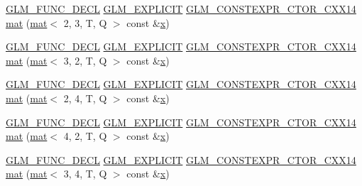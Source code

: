 \begin{DoxyCompactItemize}
\item 
\hyperlink{setup_8hpp_ab2d052de21a70539923e9bcbf6e83a51}{G\+L\+M\+\_\+\+F\+U\+N\+C\+\_\+\+D\+E\+CL} \hyperlink{setup_8hpp_a6c74f5a5e7b134ab69023ff9a30d4d5d}{G\+L\+M\+\_\+\+E\+X\+P\+L\+I\+C\+IT} \hyperlink{setup_8hpp_a0900f9145e68bf6061b6f5e7be3fa751}{G\+L\+M\+\_\+\+C\+O\+N\+S\+T\+E\+X\+P\+R\+\_\+\+C\+T\+O\+R\+\_\+\+C\+X\+X14} \hyperlink{structglm_1_1mat_3_012_00_012_00_01_t_00_01_q_01_4_a51e6cec9e2de56805620067b1a0bf615}{mat} (\hyperlink{structglm_1_1mat}{mat}$<$ 2, 3, T, Q $>$ const \&\hyperlink{_s_d_l__opengl_8h_ad0e63d0edcdbd3d79554076bf309fd47}{x})
\item 
\hyperlink{setup_8hpp_ab2d052de21a70539923e9bcbf6e83a51}{G\+L\+M\+\_\+\+F\+U\+N\+C\+\_\+\+D\+E\+CL} \hyperlink{setup_8hpp_a6c74f5a5e7b134ab69023ff9a30d4d5d}{G\+L\+M\+\_\+\+E\+X\+P\+L\+I\+C\+IT} \hyperlink{setup_8hpp_a0900f9145e68bf6061b6f5e7be3fa751}{G\+L\+M\+\_\+\+C\+O\+N\+S\+T\+E\+X\+P\+R\+\_\+\+C\+T\+O\+R\+\_\+\+C\+X\+X14} \hyperlink{structglm_1_1mat_3_012_00_012_00_01_t_00_01_q_01_4_ad9bacde1c317144090d0254c04e43fd3}{mat} (\hyperlink{structglm_1_1mat}{mat}$<$ 3, 2, T, Q $>$ const \&\hyperlink{_s_d_l__opengl_8h_ad0e63d0edcdbd3d79554076bf309fd47}{x})
\item 
\hyperlink{setup_8hpp_ab2d052de21a70539923e9bcbf6e83a51}{G\+L\+M\+\_\+\+F\+U\+N\+C\+\_\+\+D\+E\+CL} \hyperlink{setup_8hpp_a6c74f5a5e7b134ab69023ff9a30d4d5d}{G\+L\+M\+\_\+\+E\+X\+P\+L\+I\+C\+IT} \hyperlink{setup_8hpp_a0900f9145e68bf6061b6f5e7be3fa751}{G\+L\+M\+\_\+\+C\+O\+N\+S\+T\+E\+X\+P\+R\+\_\+\+C\+T\+O\+R\+\_\+\+C\+X\+X14} \hyperlink{structglm_1_1mat_3_012_00_012_00_01_t_00_01_q_01_4_a63448d37ab1b354642855fda0a36d9c5}{mat} (\hyperlink{structglm_1_1mat}{mat}$<$ 2, 4, T, Q $>$ const \&\hyperlink{_s_d_l__opengl_8h_ad0e63d0edcdbd3d79554076bf309fd47}{x})
\item 
\hyperlink{setup_8hpp_ab2d052de21a70539923e9bcbf6e83a51}{G\+L\+M\+\_\+\+F\+U\+N\+C\+\_\+\+D\+E\+CL} \hyperlink{setup_8hpp_a6c74f5a5e7b134ab69023ff9a30d4d5d}{G\+L\+M\+\_\+\+E\+X\+P\+L\+I\+C\+IT} \hyperlink{setup_8hpp_a0900f9145e68bf6061b6f5e7be3fa751}{G\+L\+M\+\_\+\+C\+O\+N\+S\+T\+E\+X\+P\+R\+\_\+\+C\+T\+O\+R\+\_\+\+C\+X\+X14} \hyperlink{structglm_1_1mat_3_012_00_012_00_01_t_00_01_q_01_4_a91dcb7e00ab49ec551b26e0d9f1995d1}{mat} (\hyperlink{structglm_1_1mat}{mat}$<$ 4, 2, T, Q $>$ const \&\hyperlink{_s_d_l__opengl_8h_ad0e63d0edcdbd3d79554076bf309fd47}{x})
\item 
\hyperlink{setup_8hpp_ab2d052de21a70539923e9bcbf6e83a51}{G\+L\+M\+\_\+\+F\+U\+N\+C\+\_\+\+D\+E\+CL} \hyperlink{setup_8hpp_a6c74f5a5e7b134ab69023ff9a30d4d5d}{G\+L\+M\+\_\+\+E\+X\+P\+L\+I\+C\+IT} \hyperlink{setup_8hpp_a0900f9145e68bf6061b6f5e7be3fa751}{G\+L\+M\+\_\+\+C\+O\+N\+S\+T\+E\+X\+P\+R\+\_\+\+C\+T\+O\+R\+\_\+\+C\+X\+X14} \hyperlink{structglm_1_1mat_3_012_00_012_00_01_t_00_01_q_01_4_a79b318d4e27f7d75124cdb371a534970}{mat} (\hyperlink{structglm_1_1mat}{mat}$<$ 3, 4, T, Q $>$ const \&\hyperlink{_s_d_l__opengl_8h_ad0e63d0edcdbd3d79554076bf309fd47}{x})

\end{DoxyCompactItemize}
